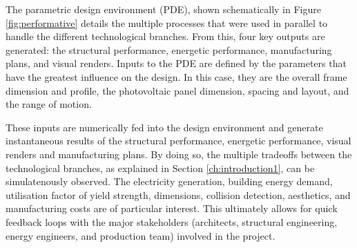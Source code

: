 
The parametric design environment (PDE), shown schematically in Figure \ref{fig:performative} details the multiple processes that were used in parallel to handle the different technological branches. From this, four key outputs are generated: the structural performance, energetic performance, manufacturing plans, and visual renders. Inputs to the PDE are defined by the parameters that have the greatest influence on the design. In this case, they are the overall frame dimension and profile, the photovoltaic panel dimension, spacing and layout, and the range of motion. 

These inputs are numerically fed into the design environment and generate instantaneous results of the structural performance, energetic performance, visual renders and manufacturing plans. By doing so, the multiple tradeoffs between the technological branches, as explained in Section \ref{ch:introduction1}, can be simulatenously observed. The electricity generation, building energy demand, utilisation factor of yield strength, dimensions, collision detection, aesthetics, and manufacturing costs are of particular interest. This ultimately allows for quick feedback loops with the major stakeholders (architects, structural engineering, energy engineers, and production team) involved in the project. \\




